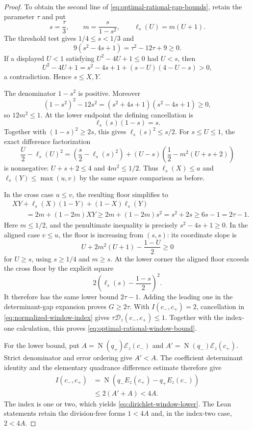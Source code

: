\documentclass[11pt]{article}
\newcommand{\Norm}[1]{\operatorname{N}\!\left(#1\right)}
\begin{document}
\begin{proof}
To obtain the second line of
\eqref{eq:optimal-rational-gap-bounds}, retain the parameter $\tau$ and put
\[
 s=\frac{\tau}{3},\qquad
 m=\frac{s}{1-s^2},\qquad
 \ell_s(U)=m(U+1).
\]
The threshold test gives $1/4\le s<1/3$ and
\begin{equation}
\label{eq:optimal-centered-norm-cut}
 9(s^2-4s+1)=\tau^2-12\tau+9\ge0.
\end{equation}
If a displayed $U<1$ satisfying
$U^2-4U+1\le0$ had $U<s$, then
\[
 U^2-4U+1
  =s^2-4s+1+(s-U)(4-U-s)>0,
\]
a contradiction.  Hence $s\le X,Y$.

The denominator $1-s^2$ is positive.  Moreover
\[
 (1-s^2)^2-12s^2
   =(s^2+4s+1)(s^2-4s+1)\ge0,
\]
so $12m^2\le1$.  At the lower endpoint the defining cancellation is
\begin{equation}
\label{eq:optimal-centered-affine-endpoint}
              \ell_s(s)(1-s)=s.
\end{equation}
Together with $(1-s)^2\ge2s$, this gives
$\ell_s(s)^2\le s/2$.  For $s\le U\le1$, the exact difference
factorization
\begin{equation}
\label{eq:optimal-centered-affine-minorant}
 \frac U2-\ell_s(U)^2
 =\left(\frac s2-\ell_s(s)^2\right)
  +(U-s)\left(\frac12-m^2(U+s+2)\right)
\end{equation}
is nonnegative: $U+s+2\le4$ and $4m^2\le1/2$.
Thus $\ell_s(X)\le a$ and
$\ell_s(Y)\le\max(u,v)$ by the same square comparison as before.

In the cross case $u\le v$, the resulting floor simplifies to
\begin{align*}
 &XY+\ell_s(X)(1-Y)+(1-X)\ell_s(Y)\\
 &\qquad=2m+(1-2m)XY
 \ge2m+(1-2m)s^2
 =s^2+2s
 \ge6s-1=2\tau-1.
\end{align*}
Here $m\le1/2$, and the penultimate inequality is precisely
$s^2-4s+1\ge0$.  In the aligned case $v\le u$, the floor is increasing from
$(s,s)$: its coordinate slope is
\[
 U+2m^2(U+1)-\frac{1-U}{2}\ge0
\]
for $U\ge s$, using $s\ge1/4$ and $m\ge s$.  At the lower corner the aligned
floor exceeds the cross floor by the explicit square
\[
 2\left(\ell_s(s)-\frac{1-s}{2}\right)^2.
\]
It therefore has the same lower bound $2\tau-1$.  Adding the leading one in
the determinant-gap expansion proves $G\ge2\tau$.  With
$I(c_-,c_+)=2$, cancellation in
\eqref{eq:normalized-window-index} gives
$\tau\mathcal D_z(c_-,c_+)\le1$.  Together with the index-one calculation,
this proves \eqref{eq:optimal-rational-window-bound}.

For the lower bound, put
$A=\Norm{q_+}\mathcal E_z(c_-)$ and
$A'=\Norm{q_-}\mathcal E_z(c_+)$.  Strict denominator and error ordering give
$A'<A$.  The coefficient determinant identity and the elementary quadrance
difference estimate therefore give
\[
\begin{split}
 I(c_-,c_+)
  &=\Norm{q_-E_z(c_+)-q_+E_z(c_-)}\\
  &\le2(A'+A)<4A.
\end{split}
\]
The index is one or two, which yields
\eqref{eq:dirichlet-window-lower}.  The Lean statements retain the
division-free forms $1<4A$ and, in the index-two case, $2<4A$.


\end{proof}
\end{document}
